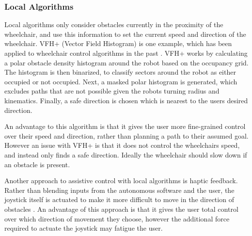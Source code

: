 \documentclass[12pt]{article}
\begin{document}
\subsubsection{Local Algorithms}
Local algorithms only consider obstacles currently in the proximity of the wheelchair,
and use this information to set the current speed and direction of the wheelchair.
VFH+ \cite{ulrichVFHReliableObstacle1998} (Vector Field Histogram) is one example, which
has been applied to wheelchair control algorithms in the past \cite{tomariEnhancingWheelchairControl2014}.
VFH+ works by calculating a polar obstacle density histogram around the robot based on the occupancy grid.
The histogram is then binarized, to classify sectors around the robot as either occupied or not occupied.
Next, a masked polar histogram is generated, which excludes paths that are not possible given the robots
turning radius and kinematics. Finally, a safe direction is chosen which is nearest to the users desired direction.

An advantage to this algorithm is that it gives the user more fine-grained control over their speed and direction,
rather than planning a path to their assumed goal.
However an issue with VFH+ is that it does not control the wheelchairs speed, and instead only finds a safe direction.
Ideally the wheelchair should slow down if an obstacle is present.

Another approach to assistive control with local algorithms is haptic feedback. Rather than
blending inputs from the autonomous software and the user, the joystick itself is actuated
to make it more difficult to move in the direction of obstacles \cite{kondoNavigationGuidanceControl2008}\cite{vanderpoortenPoweredWheelchairNavigation2012}.
An advantage of this approach is that it gives the user total control over which direction of movement they choose,
however the additional force required to actuate the joystick may fatigue the user.


\end{document}
